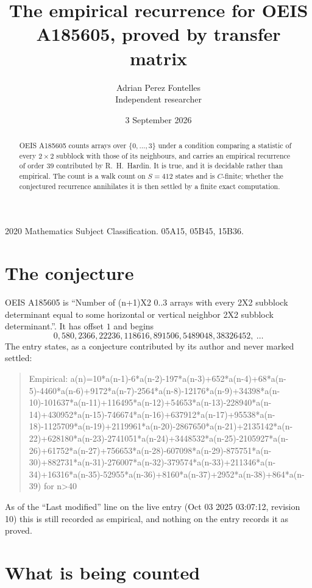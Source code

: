 \documentclass[11pt,a4paper]{article}
\title{The empirical recurrence for OEIS A185605, proved by transfer matrix}
\author{Adrian Perez Fontelles\\ \small Independent researcher}
\date{3 September 2026}
\theoremstyle{plain}
\theoremstyle{definition}
\begin{document}
\maketitle

\begin{abstract}
OEIS A185605 counts arrays over $\{0,\dots,3\}$ under a condition comparing a statistic of
every $2\times2$ subblock with those of its neighbours, and carries an empirical recurrence
of order $39$ contributed by R.~H.~Hardin. It is true, and it is decidable rather than
empirical. The count is a walk count on $S=412$ states and is $C$-finite; whether the
conjectured recurrence annihilates it is then settled by a finite exact computation.
\end{abstract}

\noindent\small 2020 Mathematics Subject Classification. 05A15, 05B45, 15B36.\normalsize

\section{The conjecture}

OEIS A185605 is ``Number of (n+1)X2 0..3 arrays with every 2X2 subblock determinant equal to some horizontal or vertical neighbor 2X2 subblock determinant.''. It has offset $1$ and begins
\[
0, 580, 2366, 22236, 118616, 891506, 5489048, 38326452,\ \dots
\]
The entry states, as a conjecture contributed by its author and never marked settled:
\begin{quote}
Empirical: a(n)=10*a(n-1)-6*a(n-2)-197*a(n-3)+652*a(n-4)+68*a(n-5)-4460*a(n-6)+9172*a(n-7)-2564*a(n-8)-12176*a(n-9)+34398*a(n-10)-101637*a(n-11)+116495*a(n-12)+54653*a(n-13)-228940*a(n-14)+430952*a(n-15)-746674*a(n-16)+637912*a(n-17)+95538*a(n-18)-1125709*a(n-19)+2119961*a(n-20)-2867650*a(n-21)+2135142*a(n-22)+628180*a(n-23)-2741051*a(n-24)+3448532*a(n-25)-2105927*a(n-26)+61752*a(n-27)+756653*a(n-28)-607098*a(n-29)-875751*a(n-30)+882731*a(n-31)-276007*a(n-32)-379574*a(n-33)+211346*a(n-34)+16316*a(n-35)-52955*a(n-36)+8160*a(n-37)+2952*a(n-38)+864*a(n-39) for n>40
\end{quote}
As of the ``Last modified'' line on the live entry (Oct 03 2025 03:07:12, revision 10) this is still
recorded as empirical, and nothing on the entry records it as proved.

\section{What is being counted}
\end{document}
